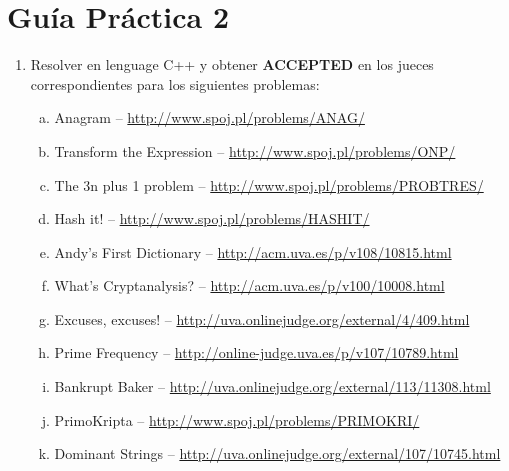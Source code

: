 




\section*{Gu\'ia Pr\'actica 2}

\begin{enumerate}[1 -]
	
	\item Resolver en lenguage C++ y obtener \textbf{ACCEPTED} en los jueces correspondientes para los siguientes problemas:
	
	\begin{enumerate}[a)]
		\item Anagram -- \href{http://www.spoj.pl/problems/ANAG/}{http://www.spoj.pl/problems/ANAG/}
		\item Transform the Expression -- \href{http://www.spoj.pl/problems/ONP/}{http://www.spoj.pl/problems/ONP/}
        \item The 3n plus 1 problem -- \href{http://www.spoj.pl/problems/PROBTRES/}{http://www.spoj.pl/problems/PROBTRES/}
		\item Hash it! -- \href{http://www.spoj.pl/problems/HASHIT/}{http://www.spoj.pl/problems/HASHIT/}
		\item Andy’s First Dictionary -- \href{http://acm.uva.es/p/v108/10815.html}{http://acm.uva.es/p/v108/10815.html}
		\item What's Cryptanalysis? -- \href{http://acm.uva.es/p/v100/10008.html}{http://acm.uva.es/p/v100/10008.html}
		\item Excuses, excuses! -- \href{http://uva.onlinejudge.org/external/4/409.html}{http://uva.onlinejudge.org/external/4/409.html}
		\item Prime Frequency -- \href{http://online-judge.uva.es/p/v107/10789.html}{http://online-judge.uva.es/p/v107/10789.html}
		\item Bankrupt Baker -- \href{http://uva.onlinejudge.org/external/113/11308.html}{http://uva.onlinejudge.org/external/113/11308.html}
		\item PrimoKripta -- \href{http://www.spoj.pl/problems/PRIMOKRI/}{http://www.spoj.pl/problems/PRIMOKRI/}
		\item Dominant Strings -- \href{http://uva.onlinejudge.org/external/107/10745.html}{http://uva.onlinejudge.org/external/107/10745.html}		
	\end{enumerate}

\end{enumerate}






